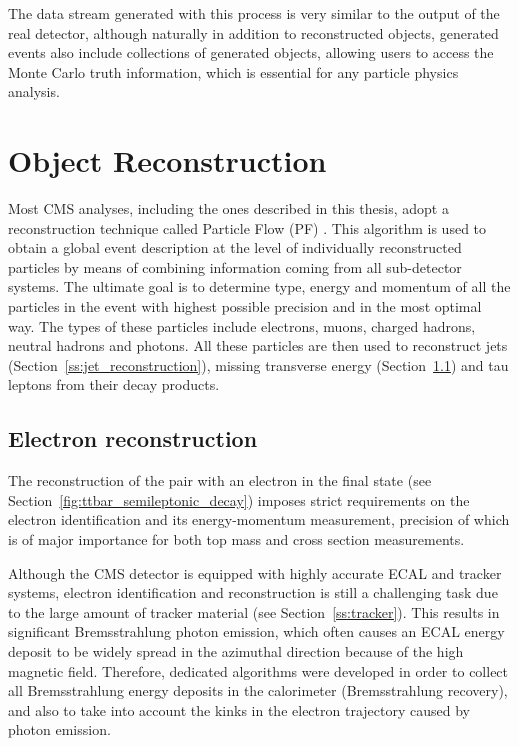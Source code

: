 The data stream generated with this process is very similar to the output of the real detector, although naturally in
addition to reconstructed objects, generated events also include collections of generated objects, allowing users to
access the Monte Carlo truth information, which is essential for any particle physics analysis.


\section{Object Reconstruction}
\label{s:object_reconstruction}
Most CMS analyses, including the ones described in this thesis, adopt a reconstruction technique called Particle Flow
(PF) \autocite{PF}. This algorithm is used to obtain a global event description at the level of individually
reconstructed particles by means of combining information coming from all sub-detector systems. The ultimate goal is to
determine type, energy and momentum of all the particles in the event with highest possible precision and in the most
optimal way. The types of these particles include electrons, muons, charged hadrons, neutral hadrons and photons. All
these particles are then used to reconstruct jets (Section~\ref{ss:jet_reconstruction}), missing transverse energy
(Section~\ref{ss:electron_reconstruction}) and tau leptons from their decay products.

\subsection{Electron reconstruction}
\label{ss:electron_reconstruction}
The reconstruction of the \ttbar pair with an electron in the final state (see
Section~\ref{fig:ttbar_semileptonic_decay}) imposes strict requirements on the electron identification and its
energy-momentum measurement, precision of which is of major importance for both top mass and
\ttbar cross section measurements.

Although the CMS detector is equipped with highly accurate ECAL and tracker systems, electron identification and
reconstruction is still a challenging task due to the large amount of tracker material (see Section~\ref{ss:tracker}).
This results in significant Bremsstrahlung photon emission, which often causes an ECAL energy deposit to be widely
spread in the azimuthal direction because of the high magnetic field. Therefore, dedicated algorithms were developed in
order to collect all Bremsstrahlung energy deposits in the calorimeter (Bremsstrahlung recovery), and also to take into
account the kinks in the electron trajectory caused by photon emission.

